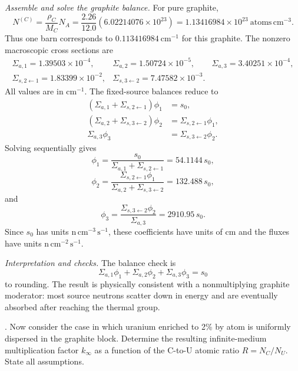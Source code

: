 \begin{adaptedsolution}
\noindent\textit{Assemble and solve the graphite balance.}
For pure graphite,
\[
N^{(C)}=\frac{\rho_C}{M_C}N_A
=\frac{2.26}{12.0}(6.02214076\times10^{23})
=1.13416984\times10^{23}~\mathrm{atoms\,cm^{-3}}.
\]
Thus one barn corresponds to
$0.113416984~\mathrm{cm^{-1}}$ for this graphite.  The nonzero macroscopic
cross sections are
\[
\begin{array}{lll}
\Sigma_{a,1}=1.39503\times10^{-4},&
\Sigma_{a,2}=1.50724\times10^{-5},&
\Sigma_{a,3}=3.40251\times10^{-4},\\
\Sigma_{s,2\leftarrow1}=1.83399\times10^{-2},&
\Sigma_{s,3\leftarrow2}=7.47582\times10^{-3}.&
\end{array}
\]
All values are in $\mathrm{cm^{-1}}$.  The fixed-source balances reduce to
\begin{align}
(\Sigma_{a,1}+\Sigma_{s,2\leftarrow1})\phi_1 &= s_0,\\
(\Sigma_{a,2}+\Sigma_{s,3\leftarrow2})\phi_2
  &= \Sigma_{s,2\leftarrow1}\phi_1,\\
\Sigma_{a,3}\phi_3 &= \Sigma_{s,3\leftarrow2}\phi_2.
\label{eq:hw14-fixed-source}
\end{align}
Solving sequentially gives
\[
\phi_1=\frac{s_0}{\Sigma_{a,1}+\Sigma_{s,2\leftarrow1}}
=54.1144\,s_0,
\]
\[
\phi_2=\frac{\Sigma_{s,2\leftarrow1}\phi_1}
{\Sigma_{a,2}+\Sigma_{s,3\leftarrow2}}
=132.488\,s_0,
\]
and
\[
\phi_3=\frac{\Sigma_{s,3\leftarrow2}\phi_2}{\Sigma_{a,3}}
=2910.95\,s_0.
\]
Since $s_0$ has units $\mathrm{n\,cm^{-3}\,s^{-1}}$, these coefficients have
units of cm and the fluxes have units $\mathrm{n\,cm^{-2}\,s^{-1}}$.

\noindent\textit{Interpretation and checks.}
The balance check is
\[
\Sigma_{a,1}\phi_1+\Sigma_{a,2}\phi_2+\Sigma_{a,3}\phi_3=s_0
\]
to rounding.  The result is physically consistent with a nonmultiplying
graphite moderator: most source neutrons scatter down in energy and are
eventually absorbed after reaching the thermal group.
\end{adaptedsolution}

\newpage

. Now consider the case in which uranium enriched to
2\%  by atom is uniformly dispersed in the graphite block.
Determine the resulting infinite-medium multiplication factor $k_\infty$ as
a function of the C-to-U atomic ratio $R=N_C/N_U$.  State all assumptions.

